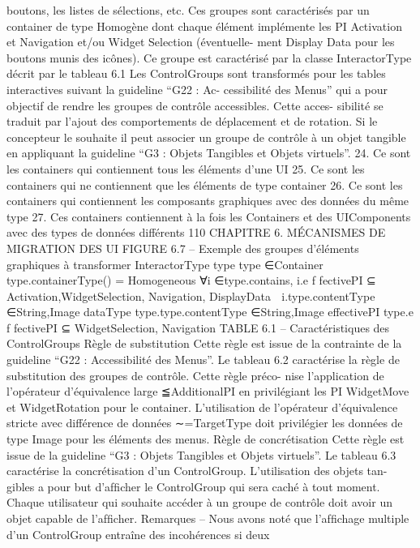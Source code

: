 \documentclass{article}
\begin{document}
boutons, les listes de sélections, etc. Ces groupes sont caractérisés par un container de type Homogène
dont chaque élément implémente les PI Activation et Navigation et/ou Widget Selection (éventuelle-
ment Display Data pour les boutons munis des icônes).
Ce groupe est caractérisé par la classe InteractorType décrit par le tableau 6.1
Les ControlGroups sont transformés pour les tables interactives suivant la guideline “G22 : Ac-
cessibilité des Menus” qui a pour objectif de rendre les groupes de contrôle accessibles. Cette acces-
sibilité se traduit par l’ajout des comportements de déplacement et de rotation. Si le concepteur le
souhaite il peut associer un groupe de contrôle à un objet tangible en appliquant la guideline “G3 :
Objets Tangibles et Objets virtuels”.
24. Ce sont les containers qui contiennent tous les éléments d’une UI
25. Ce sont les containers qui ne contiennent que les éléments de type container
26. Ce sont les containers qui contiennent les composants graphiques avec des données du même type
27. Ces containers contiennent à la fois les Containers et des UIComponents avec des types de données différents
110
CHAPITRE 6. MÉCANISMES DE MIGRATION DES UI
FIGURE 6.7 – Exemple des groupes d’éléments graphiques à transformer
InteractorType
type
type ∈{Container}
type.containerType() = {Homogeneous}
∀i ∈type.contains,
i.e f fectivePI ⊆
 Activation,WidgetSelection,
Navigation, DisplayData

i.type.contentType ∈{String,Image}
dataType
type.type.contentType ∈{String,Image}
effectivePI
type.e f fectivePI ⊆{ WidgetSelection, Navigation}
TABLE 6.1 – Caractéristiques des ControlGroups
Règle de substitution
Cette règle est issue de la contrainte de la guideline “G22 : Accessibilité des
Menus”. Le tableau 6.2 caractérise la règle de substitution des groupes de contrôle. Cette règle préco-
nise l’application de l’opérateur d’équivalence large ≦AdditionalPI en privilégiant les PI WidgetMove
et WidgetRotation pour le container. L’utilisation de l’opérateur d’équivalence stricte avec différence
de données ∼=TargetType doit privilégier les données de type Image pour les éléments des menus.
Règle de concrétisation
Cette règle est issue de la guideline “G3 : Objets Tangibles et Objets
virtuels”. Le tableau 6.3 caractérise la concrétisation d’un ControlGroup. L’utilisation des objets tan-
gibles a pour but d’afﬁcher le ControlGroup qui sera caché à tout moment. Chaque utilisateur qui
souhaite accéder à un groupe de contrôle doit avoir un objet capable de l’afﬁcher.
Remarques
– Nous avons noté que l’afﬁchage multiple d’un ControlGroup entraîne des incohérences si deux
\end{document}
